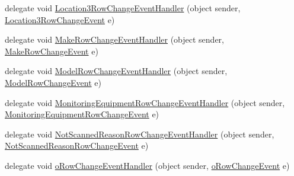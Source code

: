 \begin{DoxyCompactItemize}
\item 
delegate void \hyperlink{class_env_int_1_1_win32_1_1_field_tech_1_1_manager_1_1_data_sets_1_1_guide_ware_mobile_data_set_ab06bf43328e17eae771a2c07d051b9b3}{Location3\+Row\+Change\+Event\+Handler} (object sender, \hyperlink{class_env_int_1_1_win32_1_1_field_tech_1_1_manager_1_1_data_sets_1_1_guide_ware_mobile_data_set_1_1_location3_row_change_event}{Location3\+Row\+Change\+Event} e)
\item 
delegate void \hyperlink{class_env_int_1_1_win32_1_1_field_tech_1_1_manager_1_1_data_sets_1_1_guide_ware_mobile_data_set_a6eb1ddef39be33cf18a268b05cd32b4f}{Make\+Row\+Change\+Event\+Handler} (object sender, \hyperlink{class_env_int_1_1_win32_1_1_field_tech_1_1_manager_1_1_data_sets_1_1_guide_ware_mobile_data_set_1_1_make_row_change_event}{Make\+Row\+Change\+Event} e)
\item 
delegate void \hyperlink{class_env_int_1_1_win32_1_1_field_tech_1_1_manager_1_1_data_sets_1_1_guide_ware_mobile_data_set_a229f51edc1098ac0242fa8a6b9b52f8b}{Model\+Row\+Change\+Event\+Handler} (object sender, \hyperlink{class_env_int_1_1_win32_1_1_field_tech_1_1_manager_1_1_data_sets_1_1_guide_ware_mobile_data_set_1_1_model_row_change_event}{Model\+Row\+Change\+Event} e)
\item 
delegate void \hyperlink{class_env_int_1_1_win32_1_1_field_tech_1_1_manager_1_1_data_sets_1_1_guide_ware_mobile_data_set_a394b1514a56224f6d11f74408383305b}{Monitoring\+Equipment\+Row\+Change\+Event\+Handler} (object sender, \hyperlink{class_env_int_1_1_win32_1_1_field_tech_1_1_manager_1_1_data_sets_1_1_guide_ware_mobile_data_set_508b9e1e7fb778ecd4f9ec08c0203079}{Monitoring\+Equipment\+Row\+Change\+Event} e)
\item 
delegate void \hyperlink{class_env_int_1_1_win32_1_1_field_tech_1_1_manager_1_1_data_sets_1_1_guide_ware_mobile_data_set_a648fc43ba2f86d7260eb36d5f83eef39}{Not\+Scanned\+Reason\+Row\+Change\+Event\+Handler} (object sender, \hyperlink{class_env_int_1_1_win32_1_1_field_tech_1_1_manager_1_1_data_sets_1_1_guide_ware_mobile_data_set_26a68af3739fcf7dfebacfa26943a678}{Not\+Scanned\+Reason\+Row\+Change\+Event} e)
\item 
delegate void \hyperlink{class_env_int_1_1_win32_1_1_field_tech_1_1_manager_1_1_data_sets_1_1_guide_ware_mobile_data_set_aa04c239e0bbbba02cb09adcdafb9d5eb}{o\+Row\+Change\+Event\+Handler} (object sender, \hyperlink{class_env_int_1_1_win32_1_1_field_tech_1_1_manager_1_1_data_sets_1_1_guide_ware_mobile_data_set_1_1o_row_change_event}{o\+Row\+Change\+Event} e)
\item 

\end{DoxyCompactItemize}
